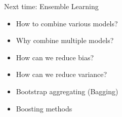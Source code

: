 \documentclass[usenames,dvipsnames]{beamer}
\begin{document}
\begin{frame}{Next time: Ensemble Learning}
\begin{itemize}
\item How to combine various models?
\item Why combine multiple models?
\pause
\item How can we reduce bias?
\item How can we reduce variance?
\item Bootstrap aggregating (Bagging)
\pause
\item Boosting methods
\end{itemize}
\end{frame}
\end{document}

